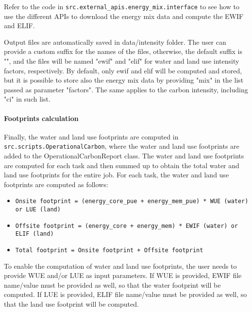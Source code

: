 \documentclass{article}
\begin{document}
Refer to the code in \verb|src.external_apis.energy_mix.interface| to see how to use the different APIs to download the energy mix data and compute the EWIF and ELIF.

Output files are automatically saved in data/intensity folder. The user can provide a custom suffix for the names of the files, otherwise, the default suffix is "", and the files will be named "ewif" and "elif" for water and land use intensity factors, respectively. By default, only ewif and elif will be computed and stored, but it is possible to store also the energy mix data by providing "mix" in the list passed as parameter "factors". The same applies to the carbon intensity, including "ci" in such list.

\paragraph{Footprints calculation}
Finally, the water and land use footprints are computed in \verb|src.scripts.OperationalCarbon|, where the water and land use footprints are added to the OperationalCarbonReport class. The water and land use footprints are computed for each task and then summed up to obtain the total water and land use footprints for the entire job. 
For each task, the water and land use footprints are computed as follows:
\begin{itemize}
    \item \verb|Onsite footprint = (energy_core_pue + energy_mem_pue) * WUE (water) or LUE (land)|
    \item \verb|Offsite footprint = (energy_core + energy_mem) * EWIF (water) or ELIF (land)|
    \item \verb|Total footprint = Onsite footprint + Offsite footprint|
\end{itemize}

To enable the computation of water and land use footprints, the user needs to provide WUE and/or LUE as input parameters. If WUE is provided, EWIF file name/value must be provided as well, so that the water footprint will be computed. If LUE is provided, ELIF file name/value must be provided as well, so that the land use footprint will be computed. 
\end{document}
